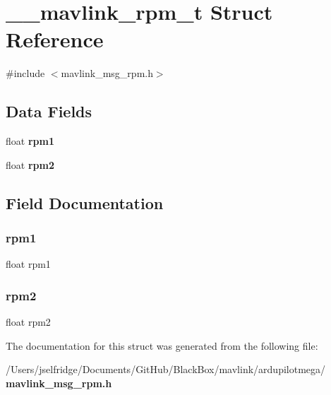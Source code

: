 \section{\+\_\+\+\_\+mavlink\+\_\+rpm\+\_\+t Struct Reference}
\label{struct____mavlink__rpm__t}


{\ttfamily \#include $<$mavlink\+\_\+msg\+\_\+rpm.\+h$>$}

\subsection*{Data Fields}
\begin{DoxyCompactItemize}
\item 
float \textbf{ rpm1}
\item 
float \textbf{ rpm2}
\end{DoxyCompactItemize}


\subsection{Field Documentation}
\mbox{\label{struct____mavlink__rpm__t_ad4f97344370066a3e9be61dbbbce9590}} 
\subsubsection{rpm1}
{\footnotesize\ttfamily float rpm1}

\mbox{\label{struct____mavlink__rpm__t_a8f43a9d8d108c405e1cabe73d84ff999}} 
\subsubsection{rpm2}
{\footnotesize\ttfamily float rpm2}



The documentation for this struct was generated from the following file\+:\begin{DoxyCompactItemize}
\item 
/\+Users/jselfridge/\+Documents/\+Git\+Hub/\+Black\+Box/mavlink/ardupilotmega/\textbf{ mavlink\+\_\+msg\+\_\+rpm.\+h}\end{DoxyCompactItemize}
